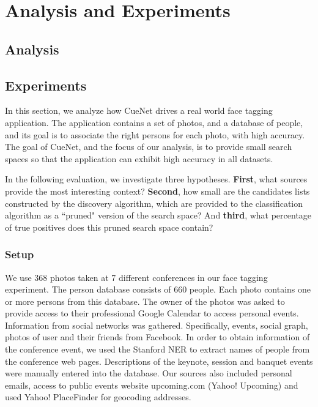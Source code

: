 \chapter{Analysis and Experiments}

\section{Analysis}
%


\section{Experiments}
%
%
%
%

In this section, we analyze how CueNet drives a real world face tagging application. The application contains a set of photos, and a database of people, and its goal is to associate the right persons for each photo, with high accuracy. The goal of CueNet, and the focus of our analysis, is to provide small search spaces so that the application can exhibit high accuracy in all datasets.

In the following evaluation, we investigate three hypotheses. \textbf{First}, what sources provide the most interesting context? \textbf{Second}, how small are the candidates lists constructed by the discovery algorithm, which are provided to the classification algorithm as a ``pruned" version of the search space? And \textbf{third}, what percentage of true positives does this pruned search space contain?

\subsection{Setup}
We use 368 photos taken at 7 different conferences in our face tagging experiment. The person database consists of 660 people. Each photo contains one or more persons from this database. The owner of the photos was asked to provide access to their professional Google Calendar to access personal events. Information from social networks was gathered. Specifically, events, social graph, photos of user and their friends from Facebook. In order to obtain information of the conference event, we used the Stanford NER\cite{finkel2005incorporating} to extract names of people from the conference web pages. Descriptions of the keynote, session and banquet events were manually entered into the database. Our sources also included personal emails, access to public events website upcoming.com (Yahoo! Upcoming) and used Yahoo! PlaceFinder for geocoding addresses.

